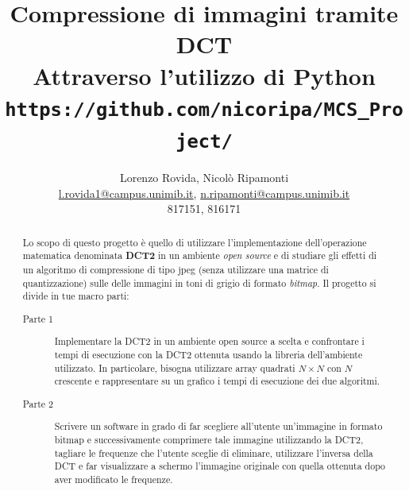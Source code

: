 \documentclass[preprint,12pt]{elsarticle}
\begin{document}
	
	
	\begin{frontmatter}
		
		\title{Compressione di immagini tramite DCT\\
			\large{Attraverso l'utilizzo di Python}
			\vspace{5mm}\\ \normalsize{\texttt{https://github.com/nicoripa/MCS\_Project/}}}
		
		\author{Lorenzo Rovida, Nicolò Ripamonti\\
			\small{ \href{mailto:l.rovida1@campus.unimib.it}{l.rovida1@campus.unimib.it},  \href{mailto:n.ripamonti@campus.unimib.it}{n.ripamonti@campus.unimib.it}\\817151, 816171}}
		
		\address{Dipartimento di Informatica, Sistemi e Comunicazione, Universitá degli Studi di Milano-Bicocca, Milano, Italia}
		
		
		\begin{abstract}
			Lo scopo di questo progetto è quello di utilizzare l’implementazione dell'operazione matematica denominata \textbf{DCT2} in un ambiente \textit{open source} e di studiare gli effetti di un algoritmo di compressione di tipo jpeg (senza utilizzare una matrice di quantizzazione) sulle delle immagini in toni di grigio di formato \textit{bitmap}.
			Il progetto si divide in tue macro parti:
			\begin{description}
				\item[Parte 1] Implementare la DCT2  in un ambiente open source a scelta e confrontare i tempi di esecuzione con la DCT2 ottenuta usando la libreria dell’ambiente utilizzato. In particolare, bisogna utilizzare array quadrati $N \times N$ con $N$ crescente e rappresentare su un grafico i tempi di esecuzione dei due algoritmi.
				\item[Parte 2] Scrivere un software in grado di far scegliere all'utente un'immagine in formato bitmap e successivamente comprimere tale immagine utilizzando la DCT2, tagliare le frequenze che l'utente sceglie di eliminare, utilizzare l'inversa della DCT e far visualizzare a schermo l'immagine originale con quella ottenuta dopo aver modificato le frequenze.
			\end{description}
		\end{abstract}
		
	\end{frontmatter}
	
\end{document}

